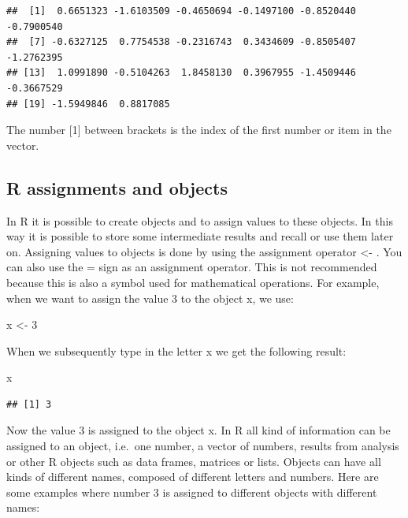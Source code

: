 \documentclass[]{book}
\newenvironment{Shaded}{\begin{snugshade}}{\end{snugshade}}
\newcommand{\DecValTok}[1]{\textcolor[rgb]{0.00,0.00,0.81}{#1}}
\newcommand{\StringTok}[1]{\textcolor[rgb]{0.31,0.60,0.02}{#1}}
\newcommand{\NormalTok}[1]{#1}
\theoremstyle{definition}
\theoremstyle{definition}
\theoremstyle{definition}
\theoremstyle{remark}
\begin{document}
\begin{verbatim}
##  [1]  0.6651323 -1.6103509 -0.4650694 -0.1497100 -0.8520440 -0.7900540
##  [7] -0.6327125  0.7754538 -0.2316743  0.3434609 -0.8505407 -1.2762395
## [13]  1.0991890 -0.5104263  1.8458130  0.3967955 -1.4509446 -0.3667529
## [19] -1.5949846  0.8817085
\end{verbatim}

The number {[}1{]} between brackets is the index of the first number or
item in the vector.

\subsection{R assignments and objects}\label{r-assignments-and-objects}

In R it is possible to create objects and to assign values to these
objects. In this way it is possible to store some intermediate results
and recall or use them later on. Assigning values to objects is done by
using the assignment operator \textless{}- . You can also use the = sign
as an assignment operator. This is not recommended because this is also
a symbol used for mathematical operations. For example, when we want to
assign the value 3 to the object x, we use:

\begin{Shaded}
\begin{Highlighting}[]
\NormalTok{x <-}\StringTok{ }\DecValTok{3} 
\end{Highlighting}
\end{Shaded}

When we subsequently type in the letter x we get the following result:

\begin{Shaded}
\begin{Highlighting}[]
\NormalTok{x }
\end{Highlighting}
\end{Shaded}

\begin{verbatim}
## [1] 3
\end{verbatim}

Now the value 3 is assigned to the object x. In R all kind of
information can be assigned to an object, i.e.~one number, a vector of
numbers, results from analysis or other R objects such as data frames,
matrices or lists. Objects can have all kinds of different names,
composed of different letters and numbers. Here are some examples where
number 3 is assigned to different objects with different names:
\end{document}
